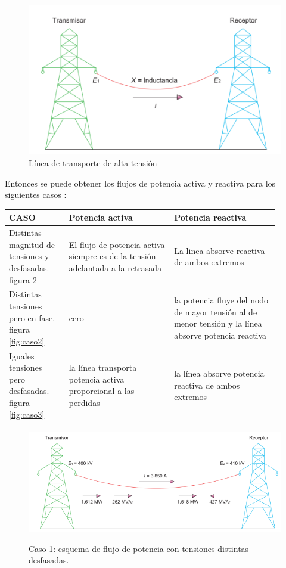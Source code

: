 \documentclass[a5paper]{book}%
\begin{document}
\begin{figure}[H]
  \centering
  
  \caption{Línea de transporte de alta tensión}
  \label{fig:lineaat}
  \includegraphics[width=\linewidth]{linea_transporte_AT}
\end{figure}

Entonces se puede obtener los flujos de potencia activa y reactiva
para los siguientes casos \cite{trashorras2015subestaciones}:

\begin{tabular}[H]{|p{0.2\linewidth}|p{0.35\linewidth}|p{0.35\linewidth}|}
  \hline
  CASO & Potencia \textbf{activa} & Potencia \textbf{reactiva}\\\hline
  Distintas magnitud de tensiones  y desfasadas. figura \ref{fig:caso1}  & El flujo de potencia activa siempre es de la tensión adelantada a la  retrasada& La linea absorve reactiva de ambos extremos\\\hline
  Distintas tensiones pero en fase. figura \ref{fig:caso2} & cero&la potencia fluye del nodo  de mayor tensión al de menor tensión y la línea absorve potencia reactiva  \\\hline
  Iguales tensiones pero desfasadas. figura \ref{fig:caso3}  &la línea transporta potencia activa proporcional a las perdidas &la línea absorve potencia reactiva de ambos extremos\\\hline
\end{tabular}


\begin{figure}[H]
  \centering
  \caption{Caso 1: esquema de flujo de potencia con tensiones distintas
    desfasadas.}
  \includegraphics[width=\linewidth]{caso1}
  \label{fig:caso1}
\end{figure}
\end{document}
